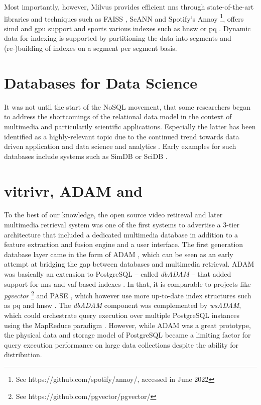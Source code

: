 Most importantly, however, Milvus provides efficient \acrshort{nns} through state-of-the-art libraries and techniques such as FAISS \cite{Johnson:2019Billion}, ScANN \cite{Guo:2020Accelerating} and Spotify's Annoy \footnote{See https://github.com/spotify/annoy/, accessed in June 2022}, offers \acrshort{simd} and \acrshort{gpu} support and sports various indexes such as \acrshort{hnsw} \cite{Malkov:2018Efficient} or \acrshort{pq} \cite{Jegou:2010Product}. Dynamic data for indexing is supported by partitioning the data into segments and (re-)building of indexes on a segment per segment basis.

\section{Databases for Data Science}
It was not until the start of the NoSQL movement, that some researchers began to address the shortcomings of the relational data model in the context of multimedia and particularily scientific applications. Especially the latter has been identified as a highly-relevant topic due to the continued trend towards data driven application and data science and analytics \cite{Abadi:2020Seattle}. Early examples for such databases include systems such as SimDB \cite{Silva:2010SimDB} or SciDB \cite{Stonebraker:2013SciDB}.
 
\section{vitrivr, ADAM and \texorpdfstring{\adampro{}}{ADAMpro}}

To the best of our knowledge, the open source \vitrivr{} video retireval \cite{Rossetto:2016vitrivr} and later multimedia retrieval \cite{Gasser:2019Multimodal} system was one of the first systems to advertise a 3-tier architecture that included a dedicated multimedia database in addition to a feature extraction and fusion engine and a user interface. The first generation database layer came in the form of ADAM \cite{Giangreco:2014Adam}, which can be seen as an early attempt at bridging the gap between databases and multimedia retrieval. ADAM was basically an extension to PostgreSQL -- called \emph{dbADAM} -- that added support for \acrshort{nns} and \acrshort{vaf}-based indexes \cite{Weber:1998Va}. In that, it is comparable to projects like \emph{pgvector} \footnote{See https://github.com/pgvector/pgvector/} and PASE \cite{Yang:2020Pase}, which however use more up-to-date index structures such as \acrshort{pq} \cite{Jegou:2010Product} and \acrshort{hnsw} \cite{Malkov:2018Efficient}. The \emph{dbADAM} component was complemented by \emph{wsADAM}, which could orchestrate query execution over multiple PostgreSQL instances using the MapReduce paradigm \cite{Dean:2008Mapreduce}. However, while ADAM was a great prototype, the physical data and storage model of PostgreSQL became a limiting factor for query execution performance on large data collections despite the ability for distribution.


